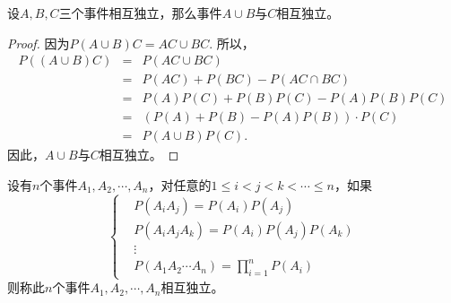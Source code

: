     
\begin{example}
    设$A,B,C$三个事件相互独立，那么事件$A\cup B$与$C$相互独立。
\end{example}
\begin{proof}
    因为$P(A\cup B) C = AC \cup BC$. 所以，
    \begin{eqnarray*}
        P((A\cup B)C) &=& P(AC \cup BC) \\
        &=& P(AC) + P(BC) - P(AC \cap BC)\\
        &=& P(A)P(C) + P(B)P(C) - P(A)P(B)P(C)\\
        &=& \left(P(A) + P(B) -P(A)P(B)\right)\cdot P(C)\\
        &=& P(A\cup B) P(C).
    \end{eqnarray*}
    因此，$A\cup B$与$C$相互独立。
\end{proof}

\begin{definition}[$n$个事件的独立性]
    设有$n$个事件$A_1,A_2,\cdots,A_n$，对任意的$1\leq i<j<k<\cdots\leq n $，如果
    \begin{equation*}
        \left\{
        \begin{aligned}
       &    P(A_iA_j) = P(A_i)P(A_j)\\
       & P(A_iA_jA_k) = P(A_i)P(A_j)P(A_k)\\
       &\vdots\\
       & P(A_1A_2\cdots A_n) = \prod_{i=1}^n P(A_i) 
        \end{aligned}
        \right.
    \end{equation*}
    则称此$n$个事件$A_1,A_2,\cdots,A_n$相互独立。
\end{definition}

